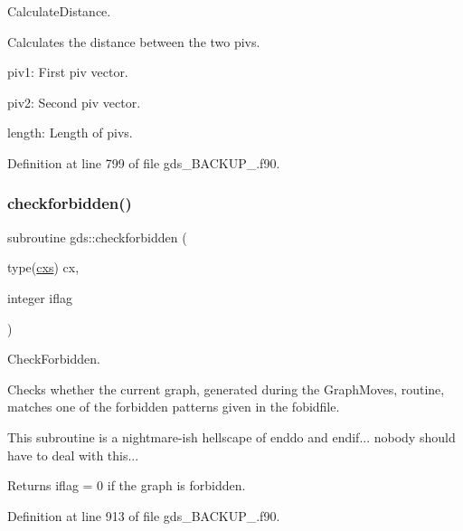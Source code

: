 Calculate\+Distance. 

Calculates the distance between the two pivs.


\begin{DoxyItemize}
\item piv1\+: First piv vector.
\item piv2\+: Second piv vector.
\item length\+: Length of pivs. 
\end{DoxyItemize}

Definition at line 799 of file gds\+\_\+\+B\+A\+C\+K\+U\+P\+\_.\+f90.

\mbox{\label{namespacegds_a37303571738e9c68948bad724cdbcddf}} 
\subsubsection{\texorpdfstring{checkforbidden()}{checkforbidden()}}
{\footnotesize\ttfamily subroutine gds\+::checkforbidden (\begin{DoxyParamCaption}\item[{type(\mbox{\hyperlink{structchemstr_1_1cxs}{cxs}})}]{cx,  }\item[{integer}]{iflag }\end{DoxyParamCaption})}



Check\+Forbidden. 

Checks whether the current graph, generated during the Graph\+Moves, routine, matches one of the forbidden patterns given in the fobidfile.

This subroutine is a nightmare-\/ish hellscape of enddo and endif... nobody should have to deal with this...

Returns iflag = 0 if the graph is forbidden. 

Definition at line 913 of file gds\+\_\+\+B\+A\+C\+K\+U\+P\+\_.\+f90.

